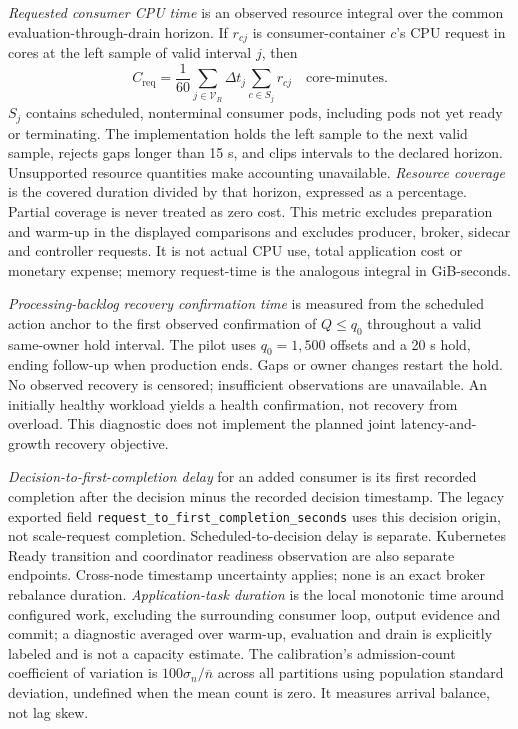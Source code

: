 \emph{Requested consumer CPU time} is an observed resource integral over the common evaluation-through-drain horizon. If $r_{cj}$ is consumer-container $c$'s CPU request in cores at the left sample of valid interval $j$, then
\[
C_{\mathrm{req}}=\frac1{60}\sum_{j\in\mathcal V_R}\Delta t_j\sum_{c\in S_j}r_{cj}
\quad\text{core-minutes}.
\]
$S_j$ contains scheduled, nonterminal consumer pods, including pods not yet ready or terminating. The implementation holds the left sample to the next valid sample, rejects gaps longer than 15 s, and clips intervals to the declared horizon. Unsupported resource quantities make accounting unavailable. \emph{Resource coverage} is the covered duration divided by that horizon, expressed as a percentage. Partial coverage is never treated as zero cost. This metric excludes preparation and warm-up in the displayed comparisons and excludes producer, broker, sidecar and controller requests. It is not actual CPU use, total application cost or monetary expense; memory request-time is the analogous integral in GiB-seconds.

\emph{Processing-backlog recovery confirmation time} is measured from the scheduled action anchor to the first observed confirmation of $Q\leq q_0$ throughout a valid same-owner hold interval. The pilot uses $q_0=1{,}500$ offsets and a 20 s hold, ending follow-up when production ends. Gaps or owner changes restart the hold. No observed recovery is censored; insufficient observations are unavailable. An initially healthy workload yields a health confirmation, not recovery from overload. This diagnostic does not implement the planned joint latency-and-growth recovery objective.

\emph{Decision-to-first-completion delay} for an added consumer is its first recorded completion after the decision minus the recorded decision timestamp. The legacy exported field \texttt{request\_to\_first\_completion\_seconds} uses this decision origin, not scale-request completion. Scheduled-to-decision delay is separate. Kubernetes Ready transition and coordinator readiness observation are also separate endpoints. Cross-node timestamp uncertainty applies; none is an exact broker rebalance duration. \emph{Application-task duration} is the local monotonic time around configured work, excluding the surrounding consumer loop, output evidence and commit; a diagnostic averaged over warm-up, evaluation and drain is explicitly labeled and is not a capacity estimate. The calibration's admission-count coefficient of variation is $100\sigma_n/\overline n$ across all partitions using population standard deviation, undefined when the mean count is zero. It measures arrival balance, not lag skew.

